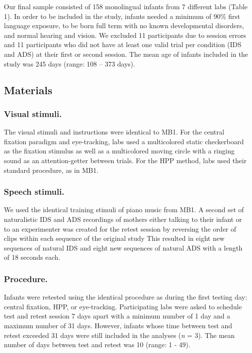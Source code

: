 \documentclass[
  man,floatsintext]{apa6}
\begin{document}
Our final sample consisted of 158 monolingual infants from 7 different labs (Table 1).
In order to be included in the study, infants needed a minimum of 90\% first language exposure, to be born full term with no known developmental disorders, and normal hearing and vision.
We excluded 11 participants due to session errors and 11 participants who did not have at least one valid trial per condition (IDS and ADS) at their first or second session.
The mean age of infants included in the study was 245 days (range: 108 -- 373 days).

\hypertarget{materials}{%
\subsection{Materials}\label{materials}}

\hypertarget{visual-stimuli.}{%
\subsubsection{Visual stimuli.}\label{visual-stimuli.}}

The visual stimuli and instructions were identical to MB1.
For the central fixation paradigm and eye-tracking, labs used a multicolored static checkerboard as the fixation stimulus as well as a multicolored moving circle with a ringing sound as an attention-getter between trials.
For the HPP method, labs used their standard procedure, as in MB1.

\hypertarget{speech-stimuli.}{%
\subsubsection{Speech stimuli.}\label{speech-stimuli.}}

We used the identical training stimuli of piano music from MB1.
A second set of naturalistic IDS and ADS recordings of mothers either talking to their infant or to an experimenter was created for the retest session by reversing the order of clips within each sequence of the original study
This resulted in eight new sequences of natural IDS and eight new sequences of natural ADS with a length of 18 seconds each.

\hypertarget{procedure.}{%
\subsubsection{Procedure.}\label{procedure.}}

Infants were retested using the identical procedure as during the first testing day: central fixation, HPP, or eye-tracking.
Participating labs were asked to schedule test and retest session 7 days apart with a minimum number of 1 day and a maximum number of 31 days.
However, infants whose time between test and retest exceeded 31 days were still included in the analyses (\emph{n} = 3).
The mean number of days between test and retest was 10 (range: 1 - 49).
\end{document}
